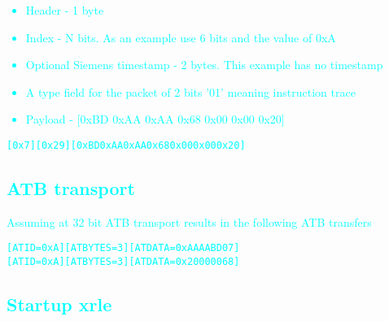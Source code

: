 \textcolor{cyan}{\begin{itemize}
\item
  Header - 1 byte
\item
  Index - N bits. As an example use 6 bits and the value of 0xA
\item
  Optional Siemens timestamp - 2 bytes. This example has no timestamp
\item
A type field for the packet of 2 bits '01' meaning instruction trace  
\item
  Payload - [0xBD 0xAA 0xAA 0x68 0x00 0x00 0x20]
\end{itemize}}

\begin {alltt}
\textcolor{cyan}{[0x7][0x29][0xBD 0xAA 0xAA 0x68 0x00 0x00 0x20]}
\end{alltt}

\textcolor{cyan}{\subsection{ATB transport}}

\textcolor{cyan}{Assuming at 32 bit ATB transport results in the following ATB transfers}

\begin {alltt}
\textcolor{cyan}{[ATID=0xA] [ATBYTES = 3] [ATDATA = 0xAAAABD07]
[ATID=0xA] [ATBYTES = 3] [ATDATA = 0x20000068]}
\end{alltt}



\textcolor{cyan}{\section{Startup xrle}}

